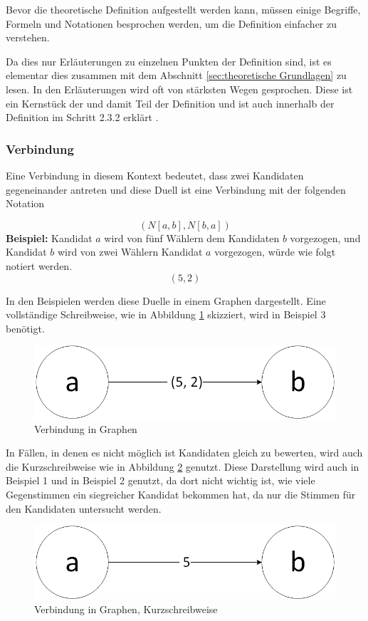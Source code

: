 Bevor die theoretische Definition aufgestellt werden kann, müssen einige Begriffe, Formeln und Notationen besprochen werden, um die Definition einfacher zu verstehen.

Da dies nur Erläuterungen zu einzelnen Punkten der Definition sind, ist es elementar dies zusammen mit dem Abschnitt \ref{sec:theoretische Grundlagen} zu lesen. In den Erläuterungen wird oft von stärksten Wegen gesprochen. Diese ist ein Kernstück der \schulze und damit Teil der Definition und ist auch innerhalb der Definition im Schritt 2.3.2 erklärt .


\subsubsection{Verbindung}
\label{sec:verbindung}
Eine Verbindung in diesem Kontext bedeutet, dass zwei Kandidaten gegeneinander antreten und diese Duell ist eine Verbindung mit der folgenden Notation

\[
(N[a,b],N[b,a])
\]
\textbf{Beispiel:}
Kandidat $a$ wird von fünf Wählern dem Kandidaten $b$ vorgezogen, und Kandidat $b$ wird von zwei Wählern Kandidat $a$ vorgezogen, würde wie folgt notiert werden. 
\[
(5,2)
\]

In den Beispielen werden diese Duelle in einem Graphen dargestellt. Eine vollständige Schreibweise, wie in Abbildung \ref{fig:verbindung1} skizziert, wird in Beispiel 3 benötigt.

\begin{figure}[!h]
\centering
\includegraphics[scale=0.5]{Bilder/Definitionab.png}
\caption{Verbindung in Graphen}
\label{fig:verbindung1}
\end{figure}

In Fällen, in denen es nicht möglich ist Kandidaten gleich zu bewerten, wird auch die Kurzschreibweise wie in Abbildung \ref{fig:verbindung2} genutzt. Diese Darstellung wird auch in Beispiel 1 und in Beispiel 2 genutzt, da dort nicht wichtig ist, wie viele Gegenstimmen ein siegreicher Kandidat bekommen hat, da nur die Stimmen für den Kandidaten untersucht werden.

\begin{figure}[!h]
\centering
\includegraphics[scale=0.5]{Bilder/DefinitionShortab.png}
\caption{Verbindung in Graphen, Kurzschreibweise}
\label{fig:verbindung2}
\end{figure}


